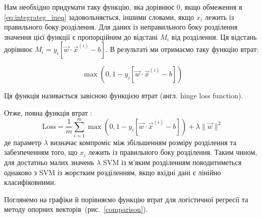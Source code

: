 \documentclass[]{article}
\begin{document}
Нам необхідно придумати таку функцію, яка дорівнює $0$, якщо обмеження в \eqref{eq:integrateg_ineq} задовольняється, іншими словами, якщо $x_i$
лежить із правильного боку розділення. Для даних із неправильного боку розділення значення цієї функції є пропорційним до відстані $M_i$ від розділення. Ця відстань дорівнює  $M_i = y_i \left[ \vec{w}\cdot \vec{x}^{(i)} - b \right]$. В результаті ми отримаємо таку функцію втрат:

\def\mo{\max\left(0, 1 - y_i \left[ \vec{w}\cdot \vec{x}^{(i)} - b \right]\right)}
\def\mt{\max\left(0, 1 + y_i \left[ \vec{w}\cdot \vec{x}^{(i)} - b \right]\right)}

\begin{equation}
		 \mo
\end{equation}

Ця функція називається завісною функцією втрат (англ. hinge loss function).

Отже, повна функція втрат :
\begin{equation}
	\mathrm{Loss} = \frac1{m} \sum_{i = 1}^m \mo + \lambda \|\vec{w}\|^2
\end{equation}
де параметр $\lambda$ визначає компроміс між збільшенням розміру розділення та забезпеченням того, що $x_i$ лежить із правильного боку розділення. Таким чином, для достатньо малих значень $\lambda$ SVM із м'яким розділенням поводитиметься однаково з SVM із жорстким розділенням, якщо вхідні дані є лінійно класифіковними.

Поглянемо на графіки й порівняємо функцію втрат для логістичної регресії та методу опорних векторів~(рис.~\ref{comparison}).
\end{document}

